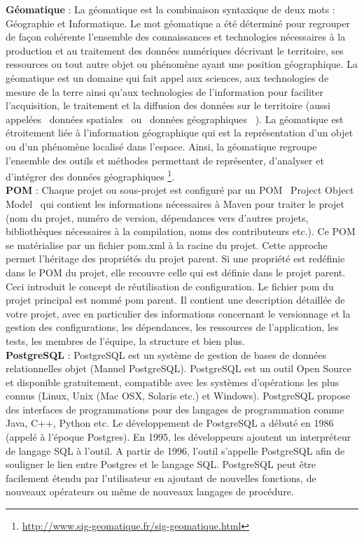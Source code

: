 \documentclass[12pt,openany]{StyleBertrand}
\makeatletter
\providecommand{\og}{\leavevmode\flqq~}%
\providecommand{\fg}{\ifdim\lastskip>\z@\unskip\fi~\frqq}%
\makeatother
\begin{document}
\textbf{Géomatique} : La géomatique est la combinaison syntaxique de deux mots : Géographie et Informatique.
Le mot géomatique a été déterminé pour regrouper de façon cohérente l'ensemble des connaissances et technologies nécessaires à la production et au traitement des données numériques décrivant le territoire, ses ressources ou tout autre objet ou phénomène ayant une position géographique.
La géomatique est un domaine qui fait appel aux sciences, aux technologies de mesure de la terre ainsi qu'aux technologies de l'information pour faciliter l'acquisition, le traitement et la diffusion des données sur le territoire (aussi appelées \og données spatiales \fg ou \og données géographiques \fg).
La géomatique est étroitement liée à l'information géographique qui est la représentation d'un objet ou d'un phénomène localisé dans l'espace.
Ainsi, la géomatique regroupe l'ensemble des outils et méthodes permettant de représenter, d'analyser et d'intégrer des données géographiques
\footnote{\url{http://www.sig-geomatique.fr/sig-geomatique.html}}.\\

\textbf{POM} : Chaque projet ou sous-projet est configuré par un POM \og Project Object Model \fg qui contient les informations nécessaires à Maven pour traiter le projet (nom du projet, numéro de version, dépendances vers d'autres projets, bibliothèques nécessaires à la compilation, noms des contributeurs etc.). Ce POM se matérialise par un fichier pom.xml à la racine du projet. Cette approche permet l'héritage des propriétés du projet parent. Si une propriété est redéfinie dans le POM du projet, elle recouvre celle qui est définie dans le projet parent. Ceci introduit le concept de réutilisation de configuration. Le fichier pom du projet principal est nommé pom parent. Il contient une description détaillée de votre projet, avec en particulier des informations concernant le versionnage et la gestion des configurations, les dépendances, les ressources de l'application, les tests, les membres de l'équipe, la structure et bien plus.\\

\textbf{PostgreSQL} : PostgreSQL est un système de gestion de bases de données relationnelles objet (Manuel PostgreSQL). PostgreSQL est un outil Open Source et disponible gratuitement, compatible avec les systèmes d'opérations les plus connus (Linux, Unix (Mac OSX, Solaris etc.) et Windows). PostgreSQL propose des interfaces de programmations pour des langages de programmation comme Java, C++, Python etc.
Le développement de PostgreSQL a débuté en 1986 (appelé à l'époque Postgres). En 1995, les développeurs ajoutent un interpréteur de langage SQL à l'outil. A partir de 1996, l'outil s'appelle PostgreSQL afin de souligner le lien entre Postgres et le langage SQL. PostgreSQL peut être facilement étendu par l'utilisateur en ajoutant de nouvelles fonctions, de nouveaux opérateurs ou même de nouveaux langages de procédure.\\
\end{document}
